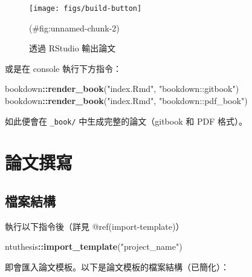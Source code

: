 \documentclass[oneside]{book}
\newenvironment{Shaded}{\begin{snugshade}}{\end{snugshade}}
\newcommand{\KeywordTok}[1]{\textcolor[rgb]{0.13,0.29,0.53}{\textbf{#1}}}
\newcommand{\NormalTok}[1]{#1}
\newcommand{\OperatorTok}[1]{\textcolor[rgb]{0.81,0.36,0.00}{\textbf{#1}}}
\newcommand{\StringTok}[1]{\textcolor[rgb]{0.31,0.60,0.02}{#1}}
\begin{document}
\begin{figure}

{\centering \texttt{[image: figs/build-button]} 

}

\caption{透過 RStudio 輸出論文}(\#fig:unnamed-chunk-2)
\end{figure}

或是在 console 執行下方指令：

\begin{Shaded}
\begin{Highlighting}[]
\NormalTok{bookdown}\OperatorTok{::}\KeywordTok{render_book}\NormalTok{(}\StringTok{"index.Rmd"}\NormalTok{, }\StringTok{"bookdown::gitbook"}\NormalTok{)}
\NormalTok{bookdown}\OperatorTok{::}\KeywordTok{render_book}\NormalTok{(}\StringTok{"index.Rmd"}\NormalTok{, }\StringTok{"bookdown::pdf_book"}\NormalTok{)}
\end{Highlighting}
\end{Shaded}

如此便會在 \texttt{\_book/} 中生成完整的論文（gitbook 和 PDF 格式）。

\hypertarget{write-thesis}{%
\chapter{論文撰寫}\label{write-thesis}}

\hypertarget{dir-structure}{%
\section{檔案結構}\label{dir-structure}}

執行以下指令後（詳見 @ref(import-template)）

\begin{Shaded}
\begin{Highlighting}[]
\NormalTok{ntuthesis}\OperatorTok{::}\KeywordTok{import_template}\NormalTok{(}\StringTok{"project_name"}\NormalTok{)}
\end{Highlighting}
\end{Shaded}

即會匯入論文模板。以下是論文模板的檔案結構（已簡化）：
\end{document}
